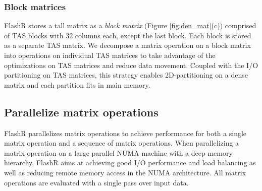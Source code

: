 \subsubsection{Block matrices} \label{sec:block_mat}
FlashR stores a tall matrix as a \textit{block matrix}
(Figure \ref{fig:den_mat}(c)) comprised of TAS blocks with $32$ columns each,
except the last block. Each block is stored as a separate TAS matrix.
We decompose a matrix operation
on a block matrix into operations on individual TAS matrices to take advantage
of the optimizations on TAS matrices and reduce data movement.
Coupled with the I/O partitioning on TAS matrices, this strategy enables
2D-partitioning on a dense matrix and each partition fits in main memory.



\subsection{Parallelize matrix operations}

FlashR parallelizes matrix operations to achieve performance for both a single
matrix operation and a sequence of matrix operations. When parallelizing a matrix
operation on a large parallel NUMA machine with a deep memory hierarchy, FlashR
aims at achieving good
I/O performance and load balancing as well as reducing remote memory access
in the NUMA architecture. All matrix operations are evaluated with
a single pass over input data.

